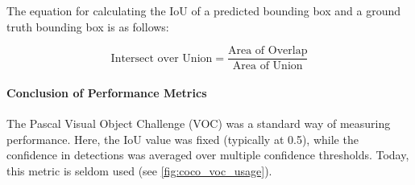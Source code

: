 The equation for calculating the IoU of a predicted bounding box and a ground truth bounding box is as follows:

\begin{equation}
    \text{Intersect over Union} = \frac{\text{Area of Overlap}}{\text{Area of Union}}
\end{equation}

\paragraph{Conclusion of Performance Metrics}
The Pascal Visual Object Challenge (VOC) was a standard way of measuring performance. Here, the IoU value was fixed (typically at 0.5), while the confidence in detections was averaged over multiple confidence thresholds. Today, this metric is seldom used (see \ref{fig:coco_voc_usage}).

